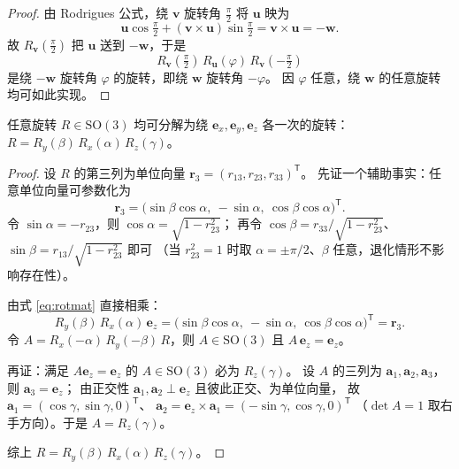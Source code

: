 \begin{proof}
  由 Rodrigues 公式，绕 $\mathbf{v}$ 旋转角 $\tfrac{\pi}{2}$ 将 $\mathbf{u}$ 映为
  \begin{equation}
    \mathbf{u}\cos\tfrac{\pi}{2} + (\mathbf{v}\times\mathbf{u})\sin\tfrac{\pi}{2}
    = \mathbf{v}\times\mathbf{u} = -\mathbf{w}.
  \end{equation}
  故 $R_{\mathbf{v}}(\tfrac{\pi}{2})$ 把 $\mathbf{u}$ 送到 $-\mathbf{w}$，于是
  \begin{equation}
    R_{\mathbf{v}}(\tfrac{\pi}{2})\, R_{\mathbf{u}}(\varphi)\, R_{\mathbf{v}}(-\tfrac{\pi}{2})
  \end{equation}
  是绕 $-\mathbf{w}$ 旋转角 $\varphi$ 的旋转，即绕 $\mathbf{w}$ 旋转角 $-\varphi$。
  因 $\varphi$ 任意，绕 $\mathbf{w}$ 的任意旋转均可如此实现。\qedhere
\end{proof}

\begin{lemma}[欧拉角分解]
  任意旋转 $R\in\mathrm{SO}(3)$ 均可分解为绕 $\mathbf{e}_x,\mathbf{e}_y,\mathbf{e}_z$
  各一次的旋转：$R = R_y(\beta)\, R_x(\alpha)\, R_z(\gamma)$。
\end{lemma}

\begin{proof}
  设 $R$ 的第三列为单位向量 $\mathbf{r}_3 = (r_{13},r_{23},r_{33})^{\mathsf T}$。
  先证一个辅助事实：任意单位向量可参数化为
  \begin{equation}
    \mathbf{r}_3 = \bigl(\sin\beta\cos\alpha,\ -\sin\alpha,\ \cos\beta\cos\alpha\bigr)^{\mathsf T}.
  \end{equation}
  令 $\sin\alpha = -r_{23}$，则 $\cos\alpha = \sqrt{1-r_{23}^{2}}$；
  再令 $\cos\beta = r_{33}/\sqrt{1-r_{23}^{2}}$、$\sin\beta = r_{13}/\sqrt{1-r_{23}^{2}}$ 即可
  （当 $r_{23}^{2}=1$ 时取 $\alpha=\pm\pi/2$、$\beta$ 任意，退化情形不影响存在性）。

  由式 \eqref{eq:rotmat} 直接相乘：
  \begin{equation}
    R_y(\beta)\, R_x(\alpha)\, \mathbf{e}_z
    = \bigl(\sin\beta\cos\alpha,\ -\sin\alpha,\ \cos\beta\cos\alpha\bigr)^{\mathsf T}
    = \mathbf{r}_3.
  \end{equation}
  令 $A = R_x(-\alpha)\, R_y(-\beta)\, R$，则 $A\in\mathrm{SO}(3)$ 且 $A\,\mathbf{e}_z = \mathbf{e}_z$。

  再证：满足 $A\mathbf{e}_z = \mathbf{e}_z$ 的 $A\in\mathrm{SO}(3)$ 必为 $R_z(\gamma)$。
  设 $A$ 的三列为 $\mathbf{a}_1,\mathbf{a}_2,\mathbf{a}_3$，则 $\mathbf{a}_3=\mathbf{e}_z$；
  由正交性 $\mathbf{a}_1,\mathbf{a}_2\perp\mathbf{e}_z$ 且彼此正交、为单位向量，
  故 $\mathbf{a}_1 = (\cos\gamma,\sin\gamma,0)^{\mathsf T}$、
  $\mathbf{a}_2 = \mathbf{e}_z\times\mathbf{a}_1 = (-\sin\gamma,\cos\gamma,0)^{\mathsf T}$
  （$\det A=1$ 取右手方向）。于是 $A = R_z(\gamma)$。

  综上 $R = R_y(\beta)\, R_x(\alpha)\, R_z(\gamma)$。\qedhere
\end{proof}

